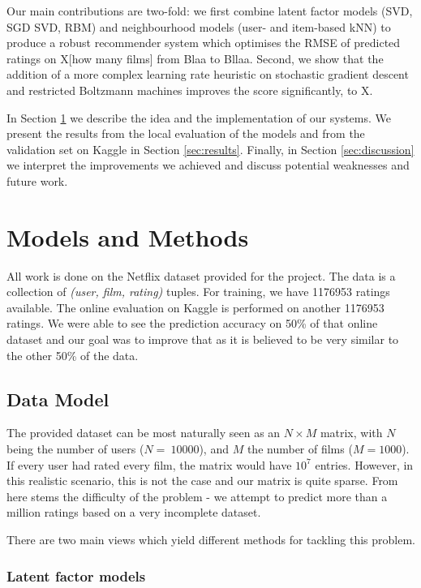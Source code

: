 \documentclass[10pt,conference,compsocconf]{IEEEtran}
\begin{document}
Our main contributions are two-fold: we first combine latent factor models (SVD, SGD SVD, RBM) and neighbourhood models (user- and item-based kNN) to produce a robust recommender system which optimises the RMSE of predicted ratings on X[how many films] from Blaa to Bllaa. Second, we show that the addition of a more complex learning rate heuristic on stochastic gradient descent and restricted Boltzmann machines improves the score significantly, to X. 

In Section \ref{sec:models} we describe the idea and the implementation of our systems. We present the results from the local evaluation of the models and from the validation set on Kaggle in Section \ref{sec:results}. Finally, in Section \ref{sec:discussion} we interpret the improvements we achieved and discuss potential weaknesses and future work.



\section{Models and Methods}
\label{sec:models}
All work is done on the Netflix dataset provided for the project. The data is a collection of \textit{(user, film, rating)} tuples. For training, we have 1176953 ratings available. The online evaluation on Kaggle is performed on another 1176953 ratings. We were able to see the prediction accuracy on 50\% of that online dataset and our goal was to improve that as it is believed to be very similar to the other 50\% of the data.
\subsection{Data Model}

The provided dataset can be most naturally seen as an $N\times M$ matrix, with $N$ being the number of users ($N=~10000$), and $M$ the number of films ($M=1000$). If every user had rated every film, the matrix would have $10^7$ entries. However, in this realistic scenario, this is not the case and our matrix is quite sparse. From here stems the difficulty of the problem - we attempt to predict more than a million ratings based on a very incomplete dataset. 

There are two main views which yield different methods for tackling this problem.

\subsubsection*{\textbf{Latent factor models}} 
\end{document}
